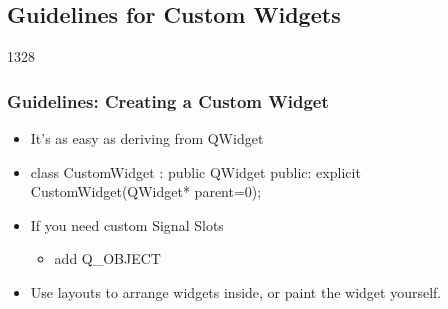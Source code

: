 %
%
%
%

\subsection{Guidelines for Custom Widgets}

\begin{slide}[fragile]{1328} \frametitle{Guidelines: Creating a Custom Widget}
  \begin{itemize}
    \item It's as easy as deriving from QWidget
    \item[] \begin{cpp}
class CustomWidget : public QWidget
{
public:
  explicit CustomWidget(QWidget* parent=0);
}
\end{cpp}           
  \item If you need custom Signal Slots
  \begin{itemize}
    \item add Q\_OBJECT
  \end{itemize} 
  \item Use layouts to arrange widgets inside, or paint the widget yourself.
\end{itemize}
\end{slide}
